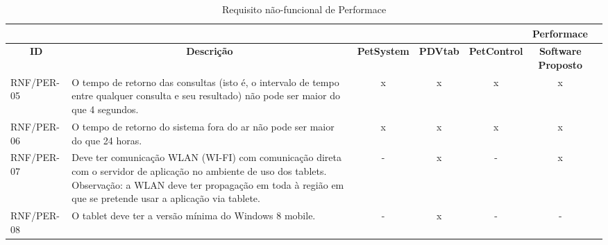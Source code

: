 \documentclass[12pt,openright,twoside,a4paper,english,french,spanish,brazil]{abntex2}
\begin{document}
\begin{landscape}
\begin{table}[!htpb]
\centering
\caption{Requisito não-funcional de Performace}\label{tab:RNF_PERF}%
\begin{small} 
\setlength{\tabcolsep}{3pt}
\begin{tabular}{|p{3cm}|p{}|c|c|c|cc|}
    \toprule
    \multicolumn{6}{r}{\textbf{Performace}} \\
    \midrule
    \multicolumn{1}{c}{\textbf{ID}} & \multicolumn{1}{c}{\textbf{Descrição}} & \multicolumn{1}{c}{\textbf{PetSystem}} & \multicolumn{1}{c}{\textbf{PDVtab}} & \multicolumn{1}{c}{\textbf{PetControl}} & \multicolumn{1}{c}{\textbf{Software Proposto}} \\
    RNF/PER-05 & O tempo de retorno das consultas (isto é, o intervalo de tempo entre qualquer consulta e seu resultado) não pode ser maior do que 4 segundos. & x & x & x & x \\
    RNF/PER-06 & O tempo de retorno do sistema fora do ar não pode ser maior do que 24 horas. & x & x & x & x \\
    RNF/PER-07 & Deve ter comunicação WLAN (WI-FI) com comunicação direta com o servidor de aplicação no ambiente de uso dos tablets. Observação: a WLAN deve ter propagação em toda à região em que se pretende usar a aplicação via tablete. & - & x & - & x \\
    RNF/PER-08 & O tablet deve ter a versão mínima do Windows 8 mobile. & - & x & - & - \\
    \bottomrule
\end{tabular}%
\end{small}
\end{table}
\end{landscape}
\newpage
\end{document}
